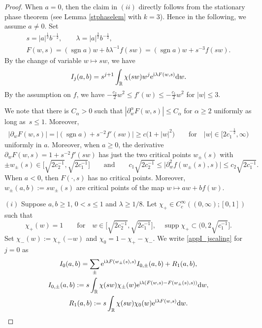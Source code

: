 \documentclass[10pt,a4paper]{amsart}
\numberwithin{equation}{section}
\def\R{\mathbb{R}}%
\DeclareMathOperator{\supp}{supp}%
\DeclareMathOperator{\sgn}{sgn}%
\def\a{\alpha}
\def\l{\lambda}
\def\pa{\partial}
\begin{document}
\begin{proof}
When $a=0$, then the claim in $(ii)$ directly follows from the stationary phase theorem (see Lemma \ref{stphaselem} with $k=3$). Hence in the following, we assume $a\neq 0$.
Set
\begin{gather*}
s=|a|^{\frac{1}{2}}b^{-\frac{1}{2}},\qquad \l=|a|^{\frac{3}{2}}b^{-\frac{1}{2}},\\ F(w,s)=(\sgn a)w+b\l^{-1}f(sw)=(\sgn a)w+s^{-3}f(sw).
\end{gather*}
By the change of variable $w\mapsto sw$, we have
\begin{align}\label{appI_jscaling}
I_j(a,b)=s^{j+1}\int_{\R}\chi(sw)w^j{\rm e}^{{\rm i}\l F(w,s)}{\rm d}w.
\end{align}
By the assumption on $f$, we have $-\frac{c_2}{2}w^2\leq f'(w)\leq -\frac{c_1}{2}w^2$ for $|w|\leq 3$.

We note that there is $C_{\a}>0$ such that $|\pa_{w}^{\a}F(w,s)|\leq C_{\a}$ for $\a\geq 2$ uniformly as long as~${s\leq 1}$. Moreover,
\begin{align}\label{apprescalef'}
|\pa_wF(w,s)|=\big|(\sgn a)+s^{-2}f'(sw)\big|\geq c\bigl(1+|w|^2\bigr)\qquad \text{for}\quad |w|\in \bigl[2c_1^{-\frac{1}{2}},\infty\bigr)
\end{align}
uniformly in $a$. Moreover, when $a\geq 0$, the derivative $\pa_wF(w,s)=1+s^{-2}f'(sw)$ has just the two critical points $w_{\pm}(s)$ with
\[
\pm w_{\pm}(s)\in \bigl[\sqrt{2c_2^{-1}},\sqrt{2c_1^{-1}}\bigr] \qquad \text{and} \qquad c_1 \sqrt{2c_2^{-1}}\leq\big|\pa_w^2f(w_{\pm}(s),s)\big| \leq c_2 \sqrt{2c_1^{-1}}.
\]
 When $a<0$, then $F(\cdot,s)$ has no critical points. Moreover, $w_{\pm}(a,b):=sw_{\pm}(s)$ are critical points of the map $w\mapsto aw+bf(w)$.

 $(i)$ Suppose $a,b\geq 1$, $0<s\leq 1$ and $\l\geq 1/8$.
Let $\chi_+\in C_c^{\infty}((0,\infty);[0,1])$ such that
\[
\chi_+(w)=1 \qquad \text{for} \quad w\in \bigl[\sqrt{2c_2^{-1}},\sqrt{2c_1^{-1}}\bigr], \quad \supp \chi_+\subset \bigl(0,2\sqrt{c_1^{-1}}\bigr].
\]
 Set $\chi_-(w):=\chi_+(-w)$ and $\chi_0=1-\chi_+-\chi_-$.
We write \eqref{appI_jscaling} for $j=0$ as
\begin{gather*}
I_0(a,b)= \sum_{\pm}{\rm e}^{{\rm i}\l F(w_{\pm}(s),s)}I_{0,\pm}(a,b)+R_1(a,b),\\
I_{0,\pm}(a,b):=s\int_{\R}\chi(sw)\chi_{\pm}(w){\rm e}^{{\rm i}\l (F(w,s)-F(w_{\pm}(s),s))}{\rm d}w,\\
 R_1(a,b):=s\int_{\R}\chi(sw)\chi_{0}(w){\rm e}^{{\rm i}\l F(w,s)}{\rm d}w.
\end{gather*}


\end{proof}
\end{document}
